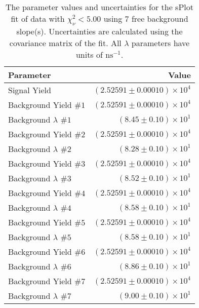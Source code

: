 
\begin{table}
    \begin{center}
        \begin{tabular}{lr}\toprule
            Parameter & Value \\\midrule
            Signal Yield & $(2.52591 \pm 0.00010) \times 10^{4}$ \\
            Background Yield $\#1$ & $(2.52591 \pm 0.00010) \times 10^{4}$ \\
            Background $\lambda$ $\#1$ & $(8.45 \pm 0.10) \times 10^{1}$ \\
            Background Yield $\#2$ & $(2.52591 \pm 0.00010) \times 10^{4}$ \\
            Background $\lambda$ $\#2$ & $(8.28 \pm 0.10) \times 10^{1}$ \\
            Background Yield $\#3$ & $(2.52591 \pm 0.00010) \times 10^{4}$ \\
            Background $\lambda$ $\#3$ & $(8.52 \pm 0.10) \times 10^{1}$ \\
            Background Yield $\#4$ & $(2.52591 \pm 0.00010) \times 10^{4}$ \\
            Background $\lambda$ $\#4$ & $(8.58 \pm 0.10) \times 10^{1}$ \\
            Background Yield $\#5$ & $(2.52591 \pm 0.00010) \times 10^{4}$ \\
            Background $\lambda$ $\#5$ & $(8.58 \pm 0.10) \times 10^{1}$ \\
            Background Yield $\#6$ & $(2.52591 \pm 0.00010) \times 10^{4}$ \\
            Background $\lambda$ $\#6$ & $(8.86 \pm 0.10) \times 10^{1}$ \\
            Background Yield $\#7$ & $(2.52591 \pm 0.00010) \times 10^{4}$ \\
            Background $\lambda$ $\#7$ & $(9.00 \pm 0.10) \times 10^{1}$ \\\bottomrule
        \end{tabular}
        \caption{The parameter values and uncertainties for the sPlot fit of data with $\chi^2_\nu < 5.00$ using 7 free background slope(s). Uncertainties are calculated using the covariance matrix of the fit. All $\lambda$ parameters have units of $\si{\nano\second}^{-1}$.}
    \end{center}
\end{table}
